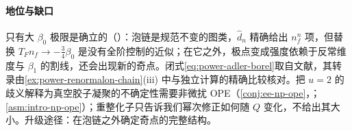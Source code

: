 \paragraph{地位与缺口}
只有大 $\beta_0$ 极限是确立的（\tagP）：泡链是规范不变的图类，$\hat d_n$ 精确给出 $n_f^n$ 项，但替换 $T_Fn_f\to-\frac34\beta_0$ 是没有全阶控制的近似；在它之外，极点变成强度依赖于反常维度与 $\beta_1$ 的割线，还会出现新的奇点\cite[第~3~节]{Beneke1999}。闭式\eqref{eq:power-adler-borel}取自文献，其转录由\cref{ex:power-renormalon-chain}(iii) 中与独立计算的精确比较核对。把 $u=2$ 的歧义解释为真空胶子凝聚的不确定性需要非微扰 OPE（\cref{conj:ee-np-ope}，\tagC；\cref{asm:intro-np-ope}）；重整化子只告诉我们幂次修正如何随 $Q$ 变化，不给出其大小\cite[第~4.2.1~节]{Beneke1999}。升级途径：在泡链之外确定奇点的完整结构。

